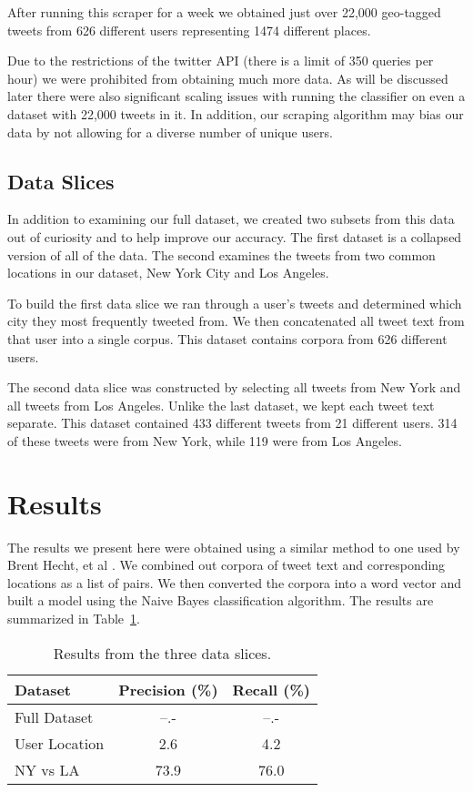 \documentclass[12pt]{article}
\begin{document}
After running this scraper for a week we obtained just over 22,000 geo-tagged tweets from 626 different users representing 1474 different places.

Due to the restrictions of the twitter API (there is a limit of 350 queries per hour) we were prohibited from obtaining much more data. As will be discussed later there were also significant scaling issues with running the classifier on even a dataset with 22,000 tweets in it. In addition, our scraping algorithm may bias our data by not allowing for a diverse number of unique users. 

\subsection*{Data Slices}
In addition to examining our full dataset, we created two subsets from this data out of curiosity and to help improve our accuracy. The first dataset is a collapsed version of all of the data. The second examines the tweets from two common locations in our dataset, New York City and Los Angeles. 

To build the first data slice we ran through a user's tweets and determined which city they most frequently tweeted from. We then concatenated all tweet text from that user into a single corpus. This dataset contains corpora from 626 different users. 

The second data slice was constructed by selecting all tweets from New York and all tweets from Los Angeles. Unlike the last dataset, we kept each tweet text separate. This dataset contained 433 different tweets from 21 different users. 314 of these tweets were from New York, while 119 were from Los Angeles. 

\section*{Results}
The results we present here were obtained using a similar method to one used by Brent Hecht, et al \cite{bhecht}. We combined out corpora of tweet text and corresponding locations as a list of pairs. We then converted the corpora into a word vector and built a model using the Naive Bayes classification algorithm. The results are summarized in Table~\ref{table:results}. 
\begin{table}
	\begin{center}
		\begin{tabular}{| l || c | c |}
			\hline
			Dataset & Precision (\%) & Recall (\%) \\ \hline
			Full Dataset & --.- & --.- \\ \hline
			User Location & 2.6 & 4.2 \\ \hline
			NY vs LA & 73.9 & 76.0 \\
			\hline
		\end{tabular}
	\end{center}
	\caption{Results from the three data slices.}
	\label{table:results}
\end{table}
\end{document}
